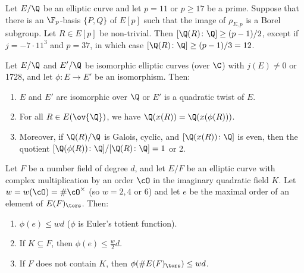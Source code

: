 

\begin{thm} %
Let $E/\Q$ be an elliptic curve and let $p= 11$ or $p \geq 17$ be a prime. Suppose that there is an $\F_p$-basis $\{P,Q\}$ of $E[p]$ such that the image of $\rho_{E,p}$ is a Borel subgroup. Let $R \in E[p]$ be non-trivial. Then $[\Q(R) \colon \Q] \geq (p - 1)/2$, except if $j= -7 \cdot 11^3$ and $p= 37$, in which case $[\Q(R) \colon \Q] \geq (p - 1)/3= 12$. 
\end{thm}


\begin{lem}
Let $E/\Q$ and $E'/\Q$ be isomorphic elliptic curves (over $\C$) with $j(E) \neq 0$ or 1728, and let $\phi: E \to E'$ be an isomorphism. Then:
	\begin{enumerate}[(1)]
	\item $E$ and $E'$ are isomorphic over $\Q$ or $E'$ is a quadratic twist of $E$.
	\item For all $R \in E(\ov{\Q})$, we have $\Q(x(R))= \Q(x(\phi(R)))$. 
	\item Moreover, if $\Q(R)/\Q$ is Galois, cyclic, and $[\Q(x(R)) \colon \Q]$ is even, then the quotient $[\Q(\phi(R)) \colon \Q] / [\Q(R) \colon \Q]= 1$ or 2. 
	\end{enumerate}
\end{lem}


\begin{thm} %
Let $F$ be a number field of degree $d$, and let $E/F$ be an elliptic curve with complex multiplication by an order $\cO$ in the imaginary quadratic field $K$. Let $w= w(\cO)= \#\cO^\times$ (so $w= 2,4$ or 6) and let $e$ be the maximal order of an element of $E(F)_\tors$. Then:
	\begin{enumerate}[(1)]
	\item$\phi(e) \leq wd$ ($\phi$ is Euler's totient function).
	\item If $K \subseteq F$, then $\phi(e) \leq \frac{w}{2} d$.
	\item If $F$ does not contain $K$, then $\phi(\#E(F)_\tors) \leq wd$. 
	\end{enumerate}
\end{thm}



